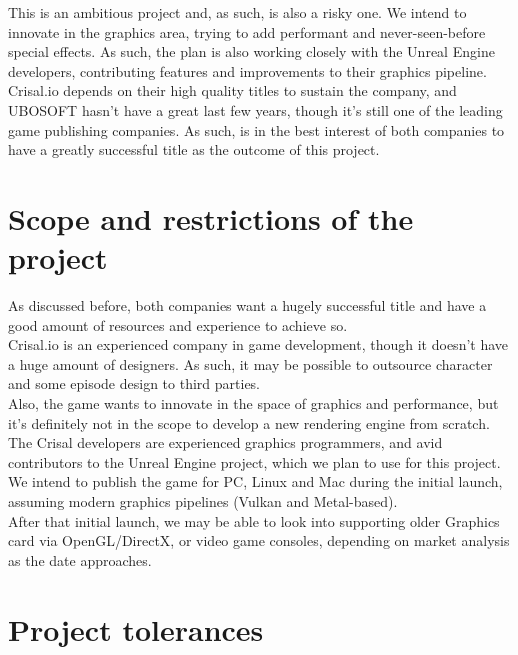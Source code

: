 \documentclass{article}
\begin{document}
  This is an ambitious project and, as such, is also a risky one. We intend to
  innovate in the graphics area, trying to add performant and never-seen-before
  special effects. As such, the plan is also working closely with the Unreal
  Engine developers, contributing features and improvements to their graphics
  pipeline. \\

  Crisal.io depends on their high quality titles to sustain the company, and
  UBOSOFT hasn't have a great last few years, though it's still one of the
  leading game publishing companies. As such, is in the best interest of both
  companies to have a greatly successful title as the outcome of this project.

\section{Scope and restrictions of the project}

  As discussed before, both companies want a hugely successful title and have a
  good amount of resources and experience to achieve so. \\

  Crisal.io is an experienced company in game development, though it doesn't
  have a huge amount of designers. As such, it may be possible to outsource
  character and some episode design to third parties. \\

  Also, the game wants to innovate in the space of graphics and performance, but
  it's definitely not in the scope to develop a new rendering engine from
  scratch. The Crisal developers are experienced graphics programmers, and avid
  contributors to the Unreal Engine project, which we plan to use for this
  project. \\

  We intend to publish the game for PC, Linux and Mac during the initial launch,
  assuming modern graphics pipelines (Vulkan and Metal-based). \\

  After that initial launch, we may be able to look into supporting older
  Graphics card via OpenGL/DirectX, or video game consoles, depending on market
  analysis as the date approaches.

\section{Project tolerances}
\end{document}
